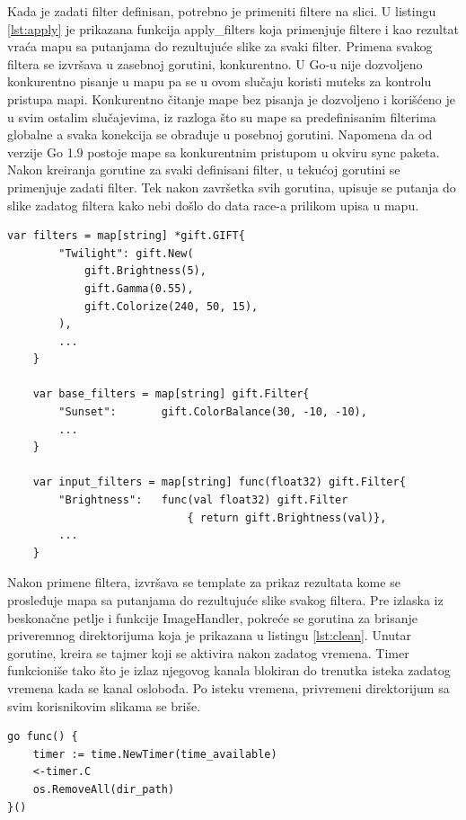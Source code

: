 \documentclass[12pt,oneside]{memoir}
\begin{document}
Kada je zadati filter definisan, potrebno je primeniti filtere na slici. U listingu \ref{lst:apply} je prikazana funkcija apply\_filters koja primenjuje filtere i kao rezultat vraća mapu sa putanjama do rezultujuće slike za svaki filter. Primena svakog filtera se izvršava u zasebnoj gorutini, konkurentno. U Go-u nije dozvoljeno konkurentno pisanje u mapu pa se u ovom slučaju koristi muteks za kontrolu pristupa mapi. Konkurentno čitanje mape bez pisanja je dozvoljeno i korišćeno je u svim ostalim slučajevima, iz razloga što su mape sa predefinisanim filterima globalne a svaka konekcija se obrađuje u posebnoj gorutini. Napomena da od verzije Go 1.9 postoje mape sa konkurentnim pristupom u okviru sync paketa. Nakon kreiranja gorutine za svaki definisani filter, u tekućoj gorutini se primenjuje zadati filter. Tek nakon završetka svih gorutina, upisuje se putanja do slike zadatog filtera kako nebi došlo do data race-a prilikom upisa u mapu. 

\begin{center}
\begin{lstlisting}[caption=Mape koje se koriste za definisanje različitih vrsta filtera,label={lst:maps},  backgroundcolor=\color{background}]
	var filters = map[string] *gift.GIFT{
		"Twilight": gift.New(
			gift.Brightness(5),
			gift.Gamma(0.55),
			gift.Colorize(240, 50, 15),
		),
		...
	}

	var base_filters = map[string] gift.Filter{
		"Sunset":      	gift.ColorBalance(30, -10, -10),
		...
	}

	var input_filters = map[string] func(float32) gift.Filter{
		"Brightness":	func(val float32) gift.Filter 
							{ return gift.Brightness(val)},
		...
	}
\end{lstlisting}
\end{center}

Nakon primene filtera, izvršava se template za prikaz rezultata kome se prosleđuje mapa sa putanjama do rezultujuće slike svakog filtera. Pre izlaska iz beskonačne petlje i funkcije ImageHandler, pokreće se gorutina za brisanje priveremnog direktorijuma koja je prikazana u listingu \ref{lst:clean}. Unutar gorutine, kreira se tajmer koji se aktivira nakon zadatog vremena. Timer funkcioniše tako što je izlaz njegovog kanala blokiran do trenutka isteka zadatog vremena kada se kanal oslobođa. Po isteku vremena, privremeni direktorijum sa svim korisnikovim slikama se briše. 

\begin{center}
\begin{lstlisting}[caption=Gorutina za brisanje privremenih direktorijuma,label={lst:clean},  backgroundcolor=\color{background}]
go func() {
	timer := time.NewTimer(time_available)
	<-timer.C
	os.RemoveAll(dir_path)
}()
\end{lstlisting}
\end{center}
\end{document}
